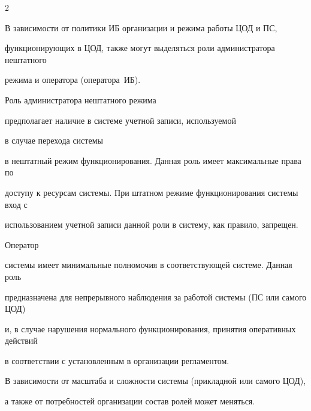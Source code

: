 \begin{multicols}{2}
{%





}


       


       В зависимости от политики ИБ организации и режима работы ЦОД и ПС, 


функционирующих в ЦОД, также могут выделяться роли администратора нештатного 


режима и оператора (оператора~ИБ).


{%





}





Роль администратора нештатного режима 


пред\-по\-ла\-га\-ет наличие в сис\-те\-ме учетной записи, ис\-поль\-зу\-емой 


в случае перехода сис\-те\-мы 


в нештатный \mbox{режим} функционирования. Данная роль имеет максимальные права по 


доступу к ресурсам сис\-те\-мы. При штатном режиме функционирования сис\-те\-мы вход с 


использованием учетной записи данной роли в сис\-те\-му, как правило, запрещен. 





Оператор 


сис\-те\-мы имеет минимальные полномочия в соответствующей сис\-те\-ме. Данная роль 


предназначена для непрерывного наблюдения за работой сис\-те\-мы (ПС или самого ЦОД) 


и, в случае нарушения нормального функционирования, принятия оперативных действий 


в соответствии с уста\-нов\-лен\-ным в организации регламентом.


       {





}





       В зависимости от масштаба и сложности сис\-те\-мы (прикладной или самого ЦОД), 


а также от потребностей организации состав ролей может меняться. 






\end{multicols}
